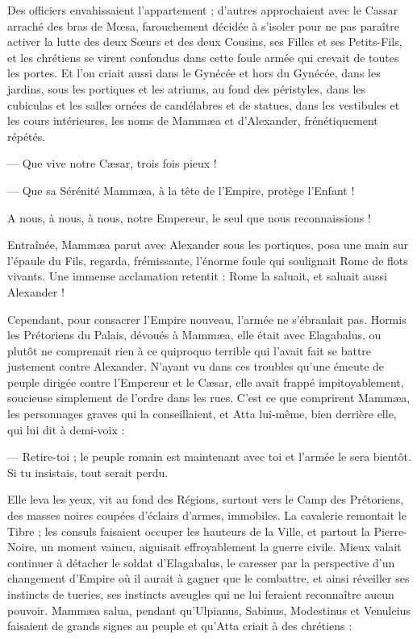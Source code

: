 \documentclass[a4paper, 11pt, oneside, polutonikogreek, french]{article}
\begin{document}
Des officiers envahissaient l'appartement ; d'autres approchaient avec le Cassar arraché des bras de Mœsa, farouchement décidée à s'isoler pour ne pas paraître activer la lutte des deux Sœurs et des deux Cousins, ses Filles et ses Petits-Fils, et les chrétiens se virent confondus dans cette foule armée qui crevait de toutes les portes. Et l'on criait aussi dans le Gynécée et hors du Gynécée, dans les jardins, sous les portiques et les atriums, au fond des péristyles, dans les cubiculas et les salles ornées de candélabres et de statues, dans les vestibules et les cours intérieures, les noms de Mammæa et d'Alexander, frénétiquement répétés.

--- Que vive notre Cæsar, trois fois pieux !

--- Que sa Sérénité Mammæa, à la tête de l'Empire, protège l'Enfant !

A nous, à nous, à nous, notre Empereur, le seul que nous reconnaissions !

Entraînée, Mammæa parut avec Alexander sous les portiques, posa une main sur l'épaule du Fils, regarda, frémissante, l'énorme foule qui soulignait Rome de flots vivants. Une immense acclamation retentit : Rome la saluait, et saluait aussi Alexander !

Cependant, pour consacrer l'Empire nouveau, l'armée ne s'ébranlait pas. Hormis les Prétoriens du Palais, dévoués à Mammæa, elle était avec Elagabalus, ou plutôt ne comprenait rien à ce quiproquo terrible qui l'avait fait se battre justement contre Alexander. N'ayant vu dans ces troubles qu'une émeute de peuple dirigée contre l'Empereur et le Cæsar, elle avait frappé impitoyablement, soucieuse simplement de l'ordre dans les rues. C'est ce que comprirent Mammæa, les personnages graves qui la conseillaient, et Atta lui-même, bien derrière elle, qui lui dit à demi-voix :

--- Retire-toi ; le peuple romain est maintenant avec toi et l'armée le sera bientôt. Si tu insistais, tout serait perdu.

Elle leva les yeux, vit au fond des Régions, surtout vers le Camp des Prétoriens, des masses noires coupées d'éclairs d'armes, immobiles. La cavalerie remontait le Tibre ; les consuls faisaient occuper les hauteurs de la Ville, et partout la Pierre-Noire, un moment vaincu, aiguisait effroyablement la guerre civile. Mieux valait continuer à détacher le soldat d'Elagabalus, le caresser par la perspective d'un changement d'Empire où il aurait à gagner que le combattre, et ainsi réveiller ses instincts de tueries, ses instincts aveugles qui ne lui feraient reconnaître aucun pouvoir. Mammæa salua, pendant qu'Ulpianus, Sabinus, Modestinus et Venuleius faisaient de grands signes au peuple et qu'Atta criait à des chrétiens :
\end{document}

